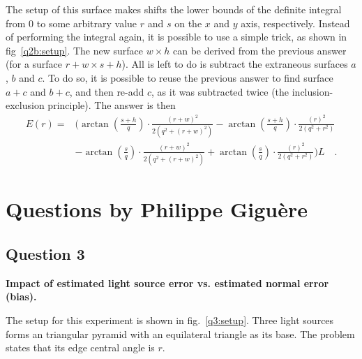 \documentclass{report}
\begin{document}
The setup of this surface makes shifts the lower bounds of the definite integral from $0$ to some arbitrary value $r$ and $s$ on the $x$ and $y$ axis, respectively. Instead of performing the integral again, it is possible to use a simple trick, as shown in fig~\ref{q2b:setup}. The new surface $w \times h$ can be derived from the previous answer (for a surface $r+w \times s+h$). All is left to do is subtract the extraneous surfaces $a$, $b$ and $c$. To do so, it is possible to reuse the previous answer to find surface $a+c$ and $b+c$, and then re-add $c$, as it was subtracted twice (the inclusion-exclusion principle). The answer is then
\begin{align*}
E(r) =& \biggl( \arctan\left(\frac{s+h}{q}\right) \cdot \frac{\left(r+w\right)^2}{2 \left(q^2 + \left(r+w\right)^2\right)}
- \arctan\left(\frac{s+h}{q}\right) \cdot \frac{\left(r\right)^2}{2 \left(q^2 + r^2\right)} \\
&- \arctan\left(\frac{s}{q}\right) \cdot \frac{\left(r+w\right)^2}{2 \left(q^2 + \left(r+w\right)^2\right)}
+ \arctan\left(\frac{s}{q}\right) \cdot \frac{\left(r\right)^2}{2 \left(q^2 + r^2\right)} \biggr) L
\quad.
\end{align*}

\chapter{Questions by Philippe Giguère}

\section{Question 3}

\textbf{Impact of estimated light source error vs. estimated normal error (bias).}

The setup for this experiment is shown in fig.~\ref{q3:setup}. Three light sources forms an triangular pyramid with an equilateral triangle as its base. The problem states that its edge central angle is $r$.
\end{document}
